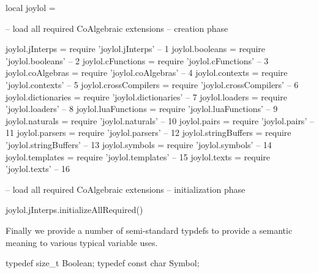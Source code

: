 \startLuaCode
local joylol = { }

-- load all required CoAlgebraic extensions -- creation phase

joylol.jInterps       = require 'joylol.jInterps'       --  1
joylol.booleans       = require 'joylol.booleans'       --  2
joylol.cFunctions     = require 'joylol.cFunctions'     --  3
joylol.coAlgebras     = require 'joylol.coAlgebras'     --  4
joylol.contexts       = require 'joylol.contexts'       --  5
joylol.crossCompilers = require 'joylol.crossCompilers' --  6
joylol.dictionaries   = require 'joylol.dictionaries'   --  7
joylol.loaders        = require 'joylol.loaders'        --  8
joylol.luaFunctions   = require 'joylol.luaFunctions'   --  9
joylol.naturals       = require 'joylol.naturals'       -- 10
joylol.pairs          = require 'joylol.pairs'          -- 11
joylol.parsers        = require 'joylol.parsers'        -- 12
joylol.stringBuffers  = require 'joylol.stringBuffers'  -- 13
joylol.symbols        = require 'joylol.symbols'        -- 14
joylol.templates      = require 'joylol.templates'      -- 15
joylol.texts          = require 'joylol.texts'          -- 16

-- load all required CoAlgebraic extensions -- initialization phase

joylol.jInterps.initializeAllRequired()

\stopLuaCode

Finally we provide a number of semi-standard typdefs to provide a semantic 
meaning to various typical variable uses. 

\startCHeader
typedef size_t     Boolean;
typedef const char Symbol;
\stopCHeader
